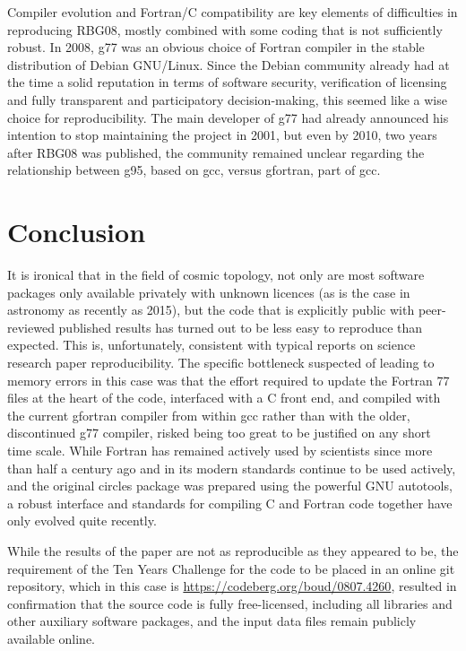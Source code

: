 Compiler evolution and Fortran/C compatibility are key elements of
difficulties in reproducing RBG08, mostly combined with some coding
that is not sufficiently robust. In 2008, {\sc g77} was an obvious
choice of Fortran compiler in the stable distribution of Debian
GNU/Linux. Since the Debian community already had at the time a solid
reputation in terms of software security, verification of licensing
and fully transparent and participatory decision-making, this seemed
like a wise choice for reproducibility.  The main developer of {\sc
  g77} had already announced his intention to stop maintaining the
project in 2001\supercite{Burley01g77}, but even by 2010, two years
after RBG08 was published, the community remained unclear regarding
the relationship between {\sc g95}, based on {\sc gcc}, versus
{\sc gfortran}, part of {\sc gcc}\supercite{Bosscher10g95}.


\section{Conclusion}

\fussy
It is ironical that in the field of cosmic topology, not only are most
software packages only available privately with unknown licences
(as is the case in astronomy as recently as 2015\supercite{Allen18}),
but the code that is explicitly public with peer-reviewed published
results has turned out to be less easy to reproduce than
expected. This is, unfortunately, consistent with typical reports on
science research paper reproducibility\supercite{Ioannidis2009,Chang15,Stodden18}.
The specific bottleneck
suspected of leading to memory errors in this case was that the effort
required to update the Fortran 77 files at the heart of the code,
interfaced with a C front end,
and compiled with the current {\sc gfortran} compiler from within {\sc gcc}
rather than with the older, discontinued\supercite{Burley01g77} {\sc g77}
compiler, risked being too great to be justified
on any short time scale. While Fortran has remained actively used by
scientists since more than half a century ago and in its modern
standards continue to be used actively, and the original {\sc
  circles} package was prepared using the powerful GNU {\sc
  autotools}, a robust interface and standards for compiling C and
Fortran code together have only evolved quite recently.

While the results of the paper are not as reproducible as they
appeared to be, the requirement of the Ten Years Challenge
for the code to be placed in an online git repository,
which in this case is \url{https://codeberg.org/boud/0807.4260},
resulted in confirmation that the source code is
fully free-licensed, including all libraries and other
auxiliary software packages, and the input data files
remain publicly available online.

